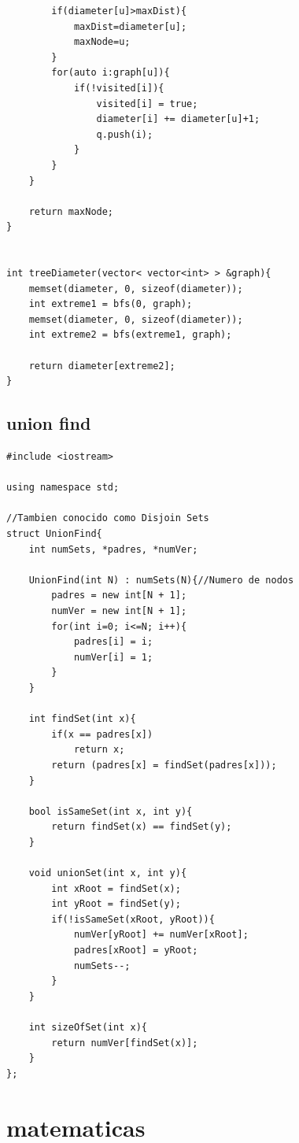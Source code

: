 \documentclass[twoside]{article}
\begin{document}
\begin{multicols*}{2}
\begin{verbatim}
		if(diameter[u]>maxDist){
			maxDist=diameter[u];
			maxNode=u;
		}
		for(auto i:graph[u]){
			if(!visited[i]){
				visited[i] = true;
				diameter[i] += diameter[u]+1;
				q.push(i);
			}
		}
	}

	return maxNode;
}


int treeDiameter(vector< vector<int> > &graph){
	memset(diameter, 0, sizeof(diameter));
	int extreme1 = bfs(0, graph);
	memset(diameter, 0, sizeof(diameter));
	int extreme2 = bfs(extreme1, graph);

	return diameter[extreme2];
}

\end{verbatim}

\subsectionfont{\large\bfseries\sffamily\underline}
\subsection*{union find}
\begin{verbatim}
#include <iostream>

using namespace std;

//Tambien conocido como Disjoin Sets
struct UnionFind{
	int numSets, *padres, *numVer;

	UnionFind(int N) : numSets(N){//Numero de nodos
		padres = new int[N + 1];
		numVer = new int[N + 1];
		for(int i=0; i<=N; i++){
			padres[i] = i;
			numVer[i] = 1;
		}
	}

	int findSet(int x){
		if(x == padres[x])
			return x;
		return (padres[x] = findSet(padres[x]));
	}

	bool isSameSet(int x, int y){
		return findSet(x) == findSet(y);
	}

	void unionSet(int x, int y){
		int xRoot = findSet(x);
		int yRoot = findSet(y);
		if(!isSameSet(xRoot, yRoot)){
			numVer[yRoot] += numVer[xRoot];
			padres[xRoot] = yRoot;
			numSets--;
		}
	}

	int sizeOfSet(int x){
		return numVer[findSet(x)];
	}
};

\end{verbatim}

\sectionfont{\bfseries\sffamily\centering\Huge}
\vspace{1em}
\section*{matematicas}
\vspace{3em}
\subsectionfont{\large\bfseries\sffamily\underline}

\end{multicols*}
\end{document}
